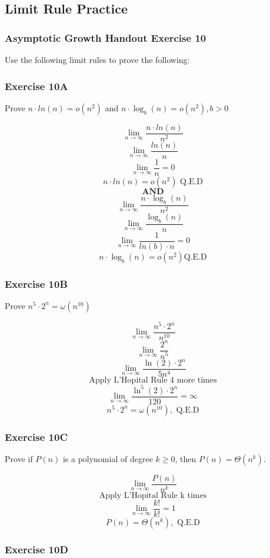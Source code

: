 \documentclass{article}
\begin{document}
\subsection{Limit Rule Practice}

\subsubsection{Asymptotic Growth Handout Exercise 10}
Use the following limit rules to prove the following:

\subsubsection{Exercise 10A}

Prove $n\cdot ln(n) = o(n^2)$ and $n \cdot \log_b(n) = o(n^2), b > 0$

$$\lim_{n \rightarrow \infty} \frac{n\cdot ln(n)}{n^2} $$
$$\lim_{n \rightarrow \infty} \frac{ln(n)}{n} $$
$$\lim_{n \rightarrow \infty} \frac{1}{n} = 0$$
$$n\cdot ln(n) = o(n^2) \text{ Q.E.D}$$
$$\textbf{AND}$$
$$\lim_{n \rightarrow \infty} \frac{n\cdot \log_b(n)}{n^2} $$
$$\lim_{n \rightarrow \infty} \frac{\log_b(n)}{n} $$
$$\lim_{n \rightarrow \infty} \frac{1}{ln(b)\cdot n} = 0$$
$$n\cdot \log_b(n) = o(n^2) \text{Q.E.D}$$

\subsubsection{Exercise 10B}
Prove $n^5 \cdot 2^n = \omega(n^{10})$

$$\lim_{n \rightarrow \infty} \frac{n^{5} \cdot 2^n}{n^{10}}$$
$$\lim_{n \rightarrow \infty} \frac{2^n}{n^5}$$
$$\lim_{n \rightarrow \infty} \frac{\ln(2) \cdot 2^n}{5n^4} $$
$$\text{Apply L'Hopital Rule 4 more times}$$
$$\lim_{n \rightarrow \infty} \frac{\ln^5(2) \cdot 2^n}{120} = \infty$$
$$n^5 \cdot 2^n = \omega(n^{10}), \text{ Q.E.D}$$

\subsubsection{Exercise 10C}

Prove if $P(n)$ is a polynomial of degree $k \geq 0$, then $P(n) = \Theta(n^k)$.

$$\lim_{n \rightarrow \infty} \frac{P(n)}{n^k}$$
$$\text{Apply L'Hopital Rule k times}$$
$$\lim_{n \rightarrow \infty} \frac{k!}{k!} = 1$$
$$ P(n) = \Theta(n^{k}), \text{ Q.E.D}$$

\subsubsection{Exercise 10D}
\end{document}
